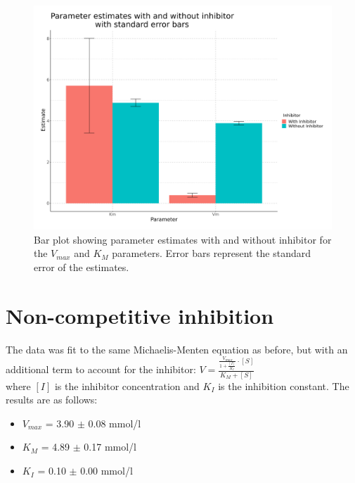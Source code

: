 \documentclass{article}
\begin{document}
\begin{figure}[H]
    \centering
    \includegraphics[width=1.2\textwidth, height=0.5\textheight]{plots/enzyme_hw_plot3.png}
    \caption{Bar plot showing parameter estimates with and without inhibitor for the $V_{max}$ and $K_M$ parameters.
        Error bars represent the standard error of the estimates.}
    \label{fig:Bar plot $V_{max}$ $K_{M}$}
\end{figure}



\section{Non-competitive inhibition}

The data was fit to the same Michaelis-Menten equation as before, but with an additional term to account for
the inhibitor: $    V =\displaystyle \frac{\displaystyle \frac{V_{max}}{1 + \frac{[I]}{K_{I}}} \cdot [S]}{K_{M} + [S]}
$\\ where $[I]$ is the inhibitor
concentration and $K_{I}$ is the inhibition constant. The results are as follows:

\begin{itemize}
    \item $V_{max}$ = 3.90 $\pm$ 0.08 mmol/l
    \item $K_{M}$ = 4.89 $\pm$ 0.17 mmol/l
    \item $K_{I}$ = 0.10 $\pm$ 0.00 mmol/l
\end{itemize}
\end{document}
